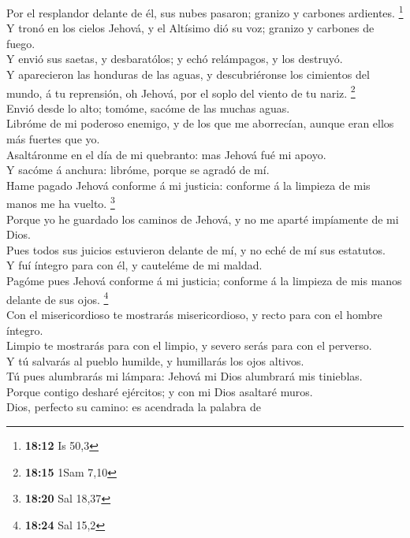 Por el resplandor delante de él, sus nubes pasaron;
granizo y carbones ardientes. \footnote{\textbf{18:12} Is 50,3}\\
 Y tronó en los cielos Jehová, y el Altísimo dió su voz;
granizo y carbones de fuego.\\
 Y envió sus saetas, y desbaratólos; y echó relámpagos, y
los destruyó.\\
 Y aparecieron las honduras de las aguas, y descubriéronse
los cimientos del mundo, á tu reprensión, oh Jehová, por el soplo del
viento de tu nariz. \footnote{\textbf{18:15} 1Sam 7,10}\\
 Envió desde lo alto; tomóme, sacóme de las muchas aguas.\\
 Libróme de mi poderoso enemigo, y de los que me
aborrecían, aunque eran ellos más fuertes que yo.\\
 Asaltáronme en el día de mi quebranto: mas Jehová fué mi
apoyo.\\
 Y sacóme á anchura: libróme, porque se agradó de mí.\\
 Hame pagado Jehová conforme á mi justicia: conforme á la
limpieza de mis manos me ha vuelto. \footnote{\textbf{18:20} Sal 18,37}\\
 Porque yo he guardado los caminos de Jehová, y no me
aparté impíamente de mi Dios.\\
 Pues todos sus juicios estuvieron delante de mí, y no eché
de mí sus estatutos.\\
 Y fuí íntegro para con él, y cauteléme de mi maldad.\\
 Pagóme pues Jehová conforme á mi justicia; conforme á la
limpieza de mis manos delante de sus ojos. \footnote{\textbf{18:24} Sal
  15,2}\\
 Con el misericordioso te mostrarás misericordioso, y recto
para con el hombre íntegro.\\
 Limpio te mostrarás para con el limpio, y severo serás
para con el perverso.\\
 Y tú salvarás al pueblo humilde, y humillarás los ojos
altivos.\\
 Tú pues alumbrarás mi lámpara: Jehová mi Dios alumbrará
mis tinieblas.\\
 Porque contigo desharé ejércitos; y con mi Dios asaltaré
muros.\\
 Dios, perfecto su camino: es acendrada la palabra de
